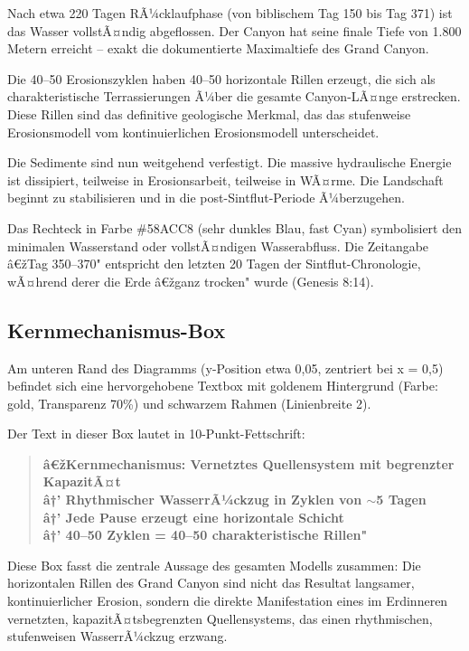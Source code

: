 ﻿\documentclass[12pt,a4paper]{report}
\begin{document}
Nach etwa 220 Tagen RÃ¼cklaufphase (von biblischem Tag 150 bis Tag 371) ist das Wasser vollstÃ¤ndig abgeflossen. Der Canyon hat seine finale Tiefe von 1.800 Metern erreicht -- exakt die dokumentierte Maximaltiefe des Grand Canyon.

Die 40--50 Erosionszyklen haben 40--50 horizontale Rillen erzeugt, die sich als charakteristische Terrassierungen Ã¼ber die gesamte Canyon-LÃ¤nge erstrecken. Diese Rillen sind das definitive geologische Merkmal, das das stufenweise Erosionsmodell vom kontinuierlichen Erosionsmodell unterscheidet.

Die Sedimente sind nun weitgehend verfestigt. Die massive hydraulische Energie ist dissipiert, teilweise in Erosionsarbeit, teilweise in WÃ¤rme. Die Landschaft beginnt zu stabilisieren und in die post-Sintflut-Periode Ã¼berzugehen.

Das Rechteck in Farbe \#58ACC8 (sehr dunkles Blau, fast Cyan) symbolisiert den minimalen Wasserstand oder vollstÃ¤ndigen Wasserabfluss. Die Zeitangabe â€žTag 350--370" entspricht den letzten 20 Tagen der Sintflut-Chronologie, wÃ¤hrend derer die Erde â€žganz trocken" wurde (Genesis 8:14).

\subsection{Kernmechanismus-Box}

Am unteren Rand des Diagramms (y-Position etwa 0,05, zentriert bei x = 0,5) befindet sich eine hervorgehobene Textbox mit goldenem Hintergrund (Farbe: gold, Transparenz 70\%) und schwarzem Rahmen (Linienbreite 2).

Der Text in dieser Box lautet in 10-Punkt-Fettschrift:
\begin{quote}
	\textbf{â€žKernmechanismus: Vernetztes Quellensystem mit begrenzter KapazitÃ¤t\\
		â†’ Rhythmischer WasserrÃ¼ckzug in Zyklen von $\sim$5 Tagen\\
		â†’ Jede Pause erzeugt eine horizontale Schicht\\
		â†’ 40--50 Zyklen = 40--50 charakteristische Rillen"}
\end{quote}

Diese Box fasst die zentrale Aussage des gesamten Modells zusammen: Die horizontalen Rillen des Grand Canyon sind nicht das Resultat langsamer, kontinuierlicher Erosion, sondern die direkte Manifestation eines im Erdinneren vernetzten, kapazitÃ¤tsbegrenzten Quellensystems, das einen rhythmischen, stufenweisen WasserrÃ¼ckzug erzwang.
\end{document}
